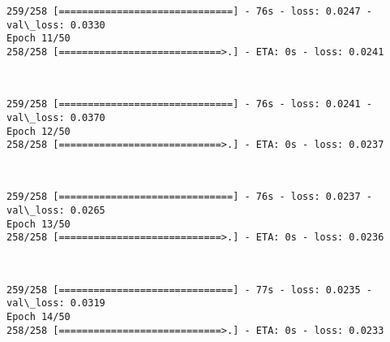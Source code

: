 \documentclass[11pt]{article}
\begin{document}
    \begin{Verbatim}[commandchars=\\\{\}]
259/258 [==============================] - 76s - loss: 0.0247 - val\_loss: 0.0330
Epoch 11/50
258/258 [============================>.] - ETA: 0s - loss: 0.0241
    \end{Verbatim}

    \begin{center}
    \end{center}
    { \hspace*{\fill} \\}
    
    \begin{Verbatim}[commandchars=\\\{\}]
259/258 [==============================] - 76s - loss: 0.0241 - val\_loss: 0.0370
Epoch 12/50
258/258 [============================>.] - ETA: 0s - loss: 0.0237
    \end{Verbatim}

    \begin{center}
    \end{center}
    { \hspace*{\fill} \\}
    
    \begin{Verbatim}[commandchars=\\\{\}]
259/258 [==============================] - 76s - loss: 0.0237 - val\_loss: 0.0265
Epoch 13/50
258/258 [============================>.] - ETA: 0s - loss: 0.0236
    \end{Verbatim}

    \begin{center}
    \end{center}
    { \hspace*{\fill} \\}
    
    \begin{Verbatim}[commandchars=\\\{\}]
259/258 [==============================] - 77s - loss: 0.0235 - val\_loss: 0.0319
Epoch 14/50
258/258 [============================>.] - ETA: 0s - loss: 0.0233
    \end{Verbatim}

    \begin{center}
    \end{center}
    { \hspace*{\fill} \\}
    
\end{document}
